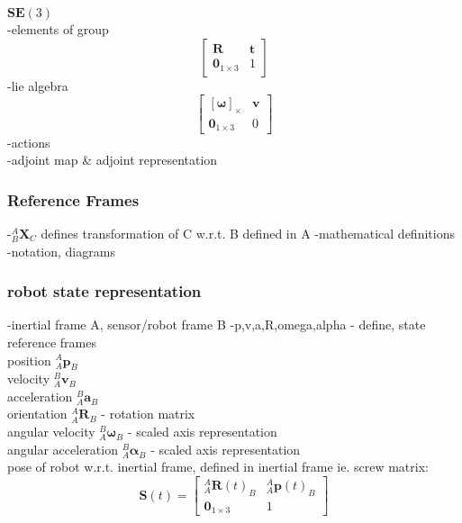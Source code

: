		\textbf{ $\textbf{SE}(3)$}\\
		-elements of group\\
		\begin{equation}
			\begin{bmatrix}
				\mathbf{R}	&	\mathbf{t} \\
			  	\textbf{0}_{1 \times 3}		& 	1 
			\end{bmatrix}
		\end{equation}
		-lie algebra\\
		\begin{equation}
			\begin{bmatrix}
				  [\mathbf{\omega}]_\times	&  \mathbf{v}\\
				  \textbf{0}_{1 \times 3} & 0						  
			\end{bmatrix}
		\end{equation}
		-actions\\
		-adjoint map \& adjoint representation
		
	\subsubsection{Reference Frames}
		-$^{A}_{B}\mathbf{X}^{}_{C}$ defines transformation of C w.r.t. B defined in A
		-mathematical definitions\\
		-notation, diagrams
	\subsubsection{robot state representation}
		-inertial frame A, sensor/robot frame  B
		-p,v,a,R,omega,alpha - define, state reference frames\\	
		position $^{A}_{A}\mathbf{p}^{}_{B}$\\
		velocity $^{B}_{A}\mathbf{v}^{}_{B}$\\
		acceleration $^{B}_{A}\mathbf{a}^{}_{B}$\\
		orientation $^{A}_{A}\mathbf{R}^{}_{B}$ - rotation matrix\\
		angular velocity $^{B}_{A}\mathbf{\omega}^{}_{B}$ - scaled axis representation\\
		angular acceleration $^{B}_{A}\mathbf{\alpha}^{}_{B}$ - scaled axis representation\\
		
		pose of robot w.r.t. inertial frame, defined in inertial frame ie. screw matrix:
		\begin{equation}
				\mathbf{S}(t) = 
				\begin{bmatrix}
						  ^{A}_{A}\mathbf{R}(t)^{}_{B} 	& 	^{A}_{A}\mathbf{p}(t)^{}_{B}\\
						  \textbf{0}_{1 \times 3} & 1						  
				\end{bmatrix}
		\end{equation}
		
